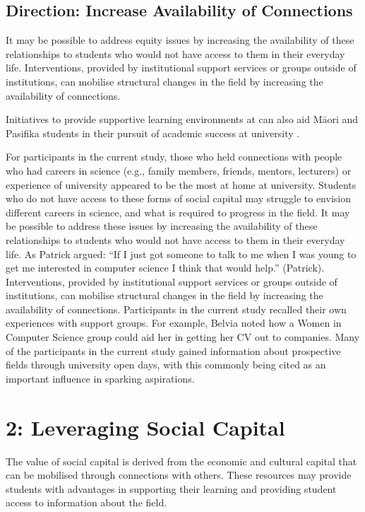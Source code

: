 \subsection{Direction: Increase Availability of Connections}
It may be possible to address equity issues by increasing the availability of these relationships to students who would not have access to them in their everyday life. Interventions, provided by institutional support services or groups outside of institutions, can mobilise structural changes in the field by increasing the availability of connections. 

 Initiatives to provide supportive learning environments at can also aid M\={a}ori and Pasifika students in their pursuit of academic success at university \cite{wilson2011awhina}. 

For participants in the current study, those who held connections with people who had careers in science (e.g., family members, friends, mentors, lecturers) or experience of university appeared to be the most at home at university. Students who do not have access to these forms of social capital may struggle to envision different careers in science, and what is required to progress in the field. It may be possible to address these issues by increasing the availability of these relationships to students who would not have access to them in their everyday life. As Patrick argued: ``If I just got someone to talk to me when I was young to get me interested in computer science I think that would help.'' (Patrick). Interventions, provided by institutional support services or groups outside of institutions, can mobilise structural changes in the field by increasing the availability of connections. Participants in the current study recalled their own experiences with support groups. For example, Belvia noted how a Women in Computer Science group could aid her in getting her CV out to companies. Many of the participants in the current study gained information about prospective fields through university open days, with this commonly being cited as an important influence in sparking aspirations. 

\section{2: Leveraging Social Capital}
The value of social capital is derived from the economic and cultural capital that can be mobilised through connections with others. These resources may provide students with advantages in supporting their learning and providing student access to information about the field. 

